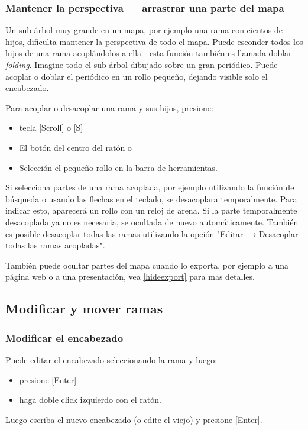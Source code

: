 \documentclass{article}
\newcommand{\ra}{$\longrightarrow$}
\newcommand{\key}[1]{[#1]}
\begin{document}
\subsubsection*{Mantener la perspectiva --- arrastrar una parte del mapa}
Un sub-\'arbol muy grande en un mapa, por ejemplo una rama con cientos de hijos, dificulta mantener la perspectiva de todo el mapa. Puede esconder todos los hijos de una rama acopl\'andolos a ella - esta funci\'on tambi\'en es llamada doblar {\em folding}. Imagine todo el sub-\'arbol dibujado sobre un gran peri\'odico. Puede acoplar o doblar el peri\'odico en un rollo peque\~no, dejando visible solo el encabezado.

Para acoplar o desacoplar una rama y sus hijos, presione:
\begin{itemize}
    \item tecla \key{Scroll} o \key{S}
    \item El bot\'on del centro del rat\'on o
    \item Selecci\'on el peque\~no rollo en la barra de herramientas.
\end{itemize}
Si selecciona partes de una rama acoplada, por ejemplo utilizando la funci\'on de b\'usqueda o usando las flechas en el teclado, se desacoplara temporalmente. Para indicar esto, aparecer\'a un rollo con un reloj de arena. Si la parte temporalmente desacoplada ya no es necesaria, se ocultada de nuevo autom\'aticamente. Tambi\'en es posible desacoplar todas las ramas utilizando la opci\'on "Editar \ra Desacoplar todas las ramas acopladas". 

Tambi\'en puede ocultar partes del mapa cuando lo exporta, por ejemplo a una p\'agina web o a una presentaci\'on, vea \ref{hideexport} para mas detalles.



\subsection{Modificar y mover ramas}
\subsubsection*{Modificar el encabezado}
Puede editar el encabezado seleccionando la rama y luego:
\begin{itemize}
    \item presione \key{Enter}
    \item haga doble click izquierdo con el rat\'on.
\end{itemize}
Luego escriba el nuevo encabezado (o edite el viejo) y presione \key{Enter}.
\end{document}
